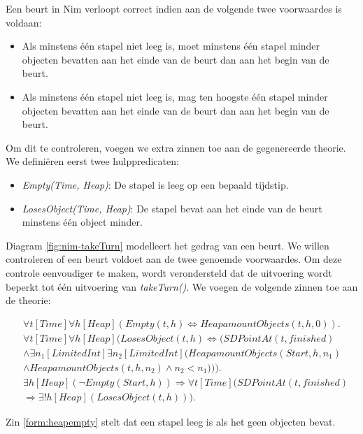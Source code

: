 Een beurt in Nim verloopt correct indien aan de volgende twee voorwaardes is voldaan:

\begin{itemize}
	\item Als minstens \'e\'en stapel niet leeg is, moet minstens \'e\'en stapel minder objecten bevatten aan het einde van de beurt dan aan het begin van de beurt.
	\item Als minstens \'e\'en stapel niet leeg is, mag ten hoogste \'e\'en stapel minder objecten bevatten aan het einde van de beurt dan aan het begin van de beurt.
\end{itemize}

Om dit te controleren, voegen we extra zinnen toe aan de gegenereerde theorie. We defini\"eren eerst twee hulppredicaten:

\begin{itemize}
	\item \textit{Empty(Time, Heap)}: De stapel is leeg op een bepaald tijdstip.
	\item \textit{LosesObject(Time, Heap)}: De stapel bevat aan het einde van de beurt minstens \'e\'en object minder.
\end{itemize}

Diagram \ref{fig:nim-takeTurn} modelleert het gedrag van een beurt. We willen controleren of een beurt voldoet aan de twee genoemde voorwaardes. Om deze controle eenvoudiger te maken, wordt verondersteld dat de uitvoering wordt beperkt tot \'e\'en uitvoering van \textit{takeTurn()}.
We voegen de volgende zinnen toe aan de theorie:

\begin{align}
	&\forall{t}[Time]\forall{h}[Heap](Empty(t, h) \Leftrightarrow HeapamountObjects(t, h, 0)).\label{form:heapempty} \\
	&\nonumber \forall{t}[Time]\forall{h}[Heap](LosesObject(t, h) \Leftrightarrow (SDPointAt(t, finished) \\ &\nonumber \land \exists{n_1}[LimitedInt]\exists{n_2}[LimitedInt](HeapamountObjects(Start, h, n_1) \\ &\land HeapamountObjects(t, h, n_2) \land n_2 < n_1))).\label{form:losesobject} \\
	&\nonumber \exists{h}[Heap](\lnot{}Empty(Start, h)) \Rightarrow \forall{t}[Time](SDPointAt(t, finished) \\ &\Rightarrow \exists!{h}[Heap](LosesObject(t, h)))\label{form:turncondition}.
\end{align}

Zin \ref{form:heapempty} stelt dat een stapel leeg is als het geen objecten bevat.

